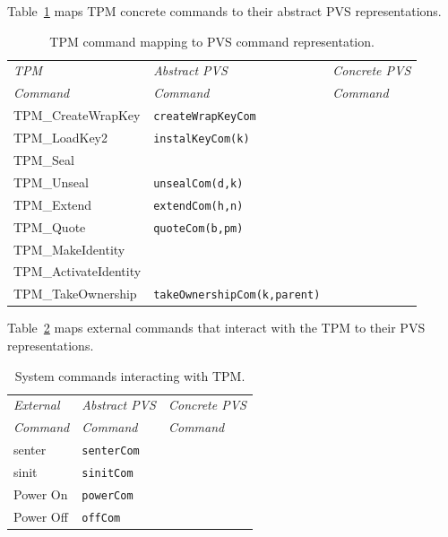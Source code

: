 \documentclass[10pt]{article}
\begin{document}
Table~\ref{tab:tpm-to-pvs} maps TPM concrete commands to their
abstract PVS representations.

\begin{table}[hbtp]
  \centering
  \begin{tabular}{lll}
    \hline
    \emph{TPM} & \emph{Abstract PVS} & \emph{Concrete PVS} \\
    \emph{Command} & \emph{Command} & \emph{Command} \\ \hline
    \textsf{TPM\_CreateWrapKey} & \verb+createWrapKeyCom+ & \\
    \textsf{TPM\_LoadKey2} & \verb+instalKeyCom(k)+ & \\
    \textsf{TPM\_Seal} & & \\
    \textsf{TPM\_Unseal} & \verb+unsealCom(d,k)+ & \\
    \textsf{TPM\_Extend} & \verb+extendCom(h,n)+ & \\
    \textsf{TPM\_Quote} & \verb+quoteCom(b,pm)+ & \\
    \textsf{TPM\_MakeIdentity} & & \\
    \textsf{TPM\_ActivateIdentity} & & \\
    \textsf{TPM\_TakeOwnership} & \verb+takeOwnershipCom(k,parent)+ & \\
    \hline
  \end{tabular}
  \caption{TPM command mapping to PVS command representation.}
  \label{tab:tpm-to-pvs}
\end{table}

Table~\ref{tab:commands-to-pvs} maps external commands that interact
with the TPM to their PVS representations.

\begin{table}[hbtp]
  \centering
  \begin{tabular}{lll}
    \hline
    \emph{External}& \emph{Abstract PVS} & \emph{Concrete PVS} \\
    \emph{Command} & \emph{Command} & \emph{Command} \\ \hline
    \textsf{senter} & \verb+senterCom+ & \\
    \textsf{sinit} & \verb+sinitCom+ & \\
    Power On & \verb+powerCom+ & \\
    Power Off  & \verb+offCom+ & \\
    \hline
  \end{tabular}
  \caption{System commands interacting with TPM.}
  \label{tab:commands-to-pvs}
\end{table}
\end{document}
